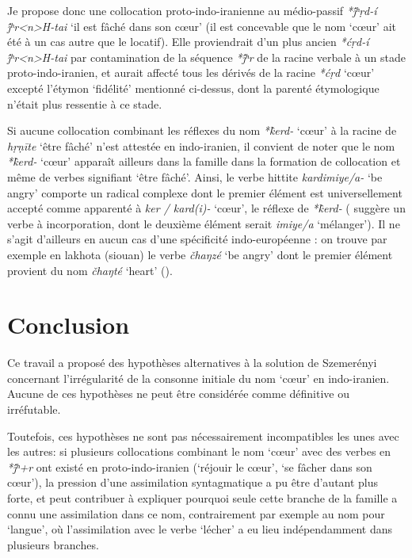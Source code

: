\documentclass{article}
\newcommand{\ipa}[1]{{\phon\textit{#1}}}
\begin{document}
Je propose donc une collocation proto-indo-iranienne au médio-passif \ipa{*j́ʰṛd-í j́ʰr<n>H-tai} `il est fâché dans son cœur' (il est concevable que le nom `cœur' ait été à un cas autre que le locatif).  Elle proviendrait d'un plus ancien \ipa{*ćṛd-í j́ʰr<n>H-tai} par contamination de la séquence \ipa{*j́ʰr} de la racine verbale à un stade proto-indo-iranien, et aurait affecté tous les dérivés de la racine \ipa{*ćṛd} `cœur' excepté l'étymon `fidélité' mentionné ci-dessus, dont la parenté étymologique n'était plus ressentie à ce stade.

Si aucune collocation combinant les réflexes du nom \ipa{*k̂erd-} `cœur' à la racine de \ipa{hṛṇīte} `être fâché' n'est attestée en indo-iranien, il convient de noter que  le nom \ipa{*k̂erd-} `cœur' apparaît ailleurs dans la famille dans  la formation de collocation et même de verbes signifiant `être fâché'. Ainsi, le verbe hittite  \ipa{kardimiye/a-} `be angry' comporte un radical complexe dont le premier élément est universellement accepté comme apparenté à \ipa{ker / kard(i)-} `cœur', le réflexe de \ipa{*k̂erd-} (\citealt[456-7]{kloekhorst08edhil} suggère un verbe à incorporation, dont le deuxième élément serait \ipa{imiye/a} `mélanger'). Il ne s'agit d'ailleurs en aucun cas d'une spécificité indo-européenne : on trouve par exemple en lakhota (siouan) le verbe  \ipa{čhaŋzé} `be angry' dont le premier élément provient du nom \ipa{čhaŋté} `heart' (\citealt{ullrich08}).

\section*{Conclusion}
Ce travail a proposé des hypothèses alternatives à la solution de Szemerényi concernant l'irrégularité de la consonne initiale du nom `cœur' en indo-iranien. Aucune de ces hypothèses ne peut être considérée comme définitive ou irréfutable. 

Toutefois, ces hypothèses ne sont pas nécessairement incompatibles les unes avec les autres: si plusieurs collocations combinant le nom `cœur' avec des verbes en \ipa{*j́ʰ+r} ont existé en proto-indo-iranien (`réjouir le cœur', `se fâcher dans son cœur'), la pression d'une assimilation syntagmatique a pu être d'autant plus forte, et peut contribuer à expliquer pourquoi seule cette branche de la famille a connu une assimilation dans ce nom, contrairement par exemple au nom pour `langue', où l'assimilation avec le verbe `lécher' a eu lieu indépendamment dans plusieurs branches.




\end{document}
